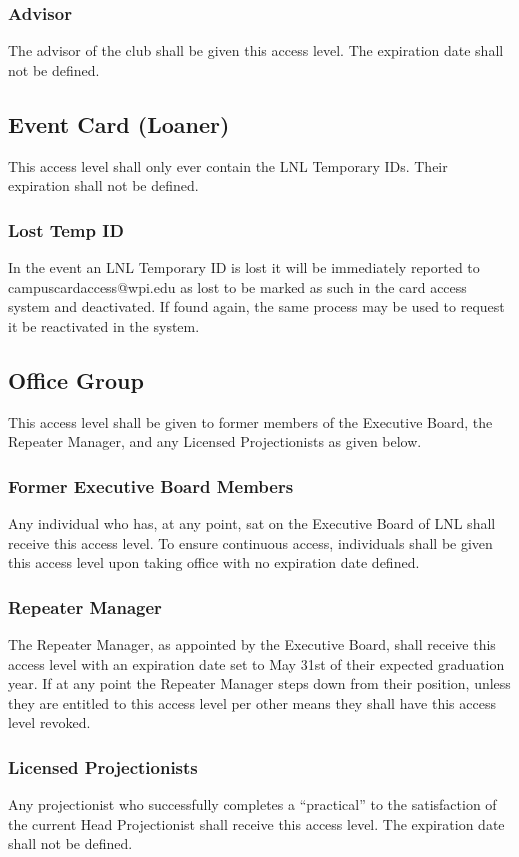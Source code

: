 \documentclass[12pt,letterpaper]{book}
\begin{document}
\subsubsection{Advisor}
The advisor of the club shall be given this access level. The expiration date shall not be defined.

\subsection{Event Card (Loaner)}
This access level shall only ever contain the LNL Temporary IDs. Their expiration shall not be defined.

\subsubsection{Lost Temp ID}
In the event an LNL Temporary ID is lost it will be immediately reported to campuscardaccess@wpi.edu as lost to be marked as such in the card access system and deactivated. If found again, the same process may be used to request it be reactivated in the system.

\subsection{Office Group}
This access level shall be given to former members of the Executive Board, the Repeater Manager, and any Licensed Projectionists as given below.

\subsubsection{Former Executive Board Members}
Any individual who has, at any point, sat on the Executive Board of LNL shall receive this access level. To ensure continuous access, individuals shall be given this access level upon taking office with no expiration date defined.

\subsubsection{Repeater Manager}
The Repeater Manager, as appointed by the Executive Board, shall receive this access level with an expiration date set to May 31st of their expected graduation year. If at any point the Repeater Manager steps down from their position, unless they are entitled to this access level per other means they shall have this access level revoked.

\subsubsection{Licensed Projectionists}
Any projectionist who successfully completes a ``practical'' to the satisfaction of the current Head Projectionist shall receive this access level. The expiration date shall not be defined.
\end{document}
